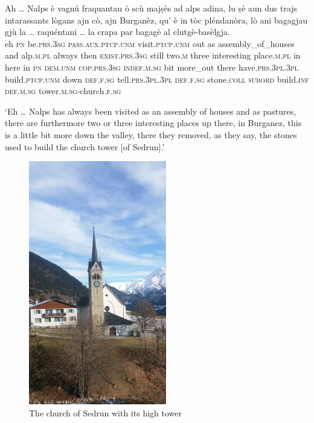\begin{linenumbers}
\gll Ah … Nalps è vagnú fraquantau ò scù majṣès ad alps adina, lu ṣè aun dus trajs intarassants lògans ajn cò, ajn Burganèz, qu' è in tòc pléndanòra, lò ani bagagjau gjù la … raquéntani … la crapa par bagagè al clutgè-basèlgja.\\
eh {}  \textsc{pn}  be.\textsc{prs.3sg} \textsc{pass.aux.ptcp.unm} visit.\textsc{ptcp.unm} out as assembly\_of\_houses and alp.\textsc{m.pl} always then \textsc{exist.prs.3sg} still two.\textsc{m} three interesting place.\textsc{m.pl} in here in \textsc{pn} \textsc{dem.unm} \textsc{cop.prs.3sg} \textsc{indef.m.sg} bit more\_out there have.\textsc{prs.3pl.3pl} build.\textsc{ptcp.unm} down \textsc{def.f.sg} {} tell.\textsc{prs.3pl.3pl} {} \textsc{def.f.sg} stone.\textsc{coll} \textsc{subord} build.\textsc{inf}  \textsc{def.m.sg} tower.\textsc{m.sg}-church.\textsc{f.sg}  \\
\end{linenumbers}
\medskip
\glt `Eh … Nalps has always been visited as an assembly of houses and as pastures, there are furthermore two or three interesting places up there, in Burganez, this is a little bit more down the valley, there they removed, as they say, the stones used to build the church tower [of Sedrun].'
\medskip

\begin{figure}
	\includegraphics[angle=360,width=
	60mm]{figures/Baselgia da Sedrun.jpg}
	\caption{The church of Sedrun with its high tower}
\end{figure}

